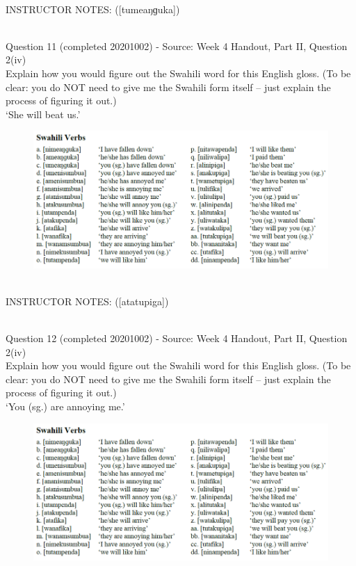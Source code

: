 \documentclass[12pt]{article}
\begin{document}
~\\
INSTRUCTOR NOTES: ([tumeaŋɡuka])


~\\

{\large Question 11} (completed 20201002) - Source: Week 4 Handout, Part II, Question 2(iv)\\

Explain how you would figure out the Swahili word for this English gloss. (To be clear: you do NOT need to give me the Swahili form itself -- just explain the process of figuring it out.)\\

‘She will beat us.’

\begin{figure}[H]
\includegraphics{../images/swahiliverbs.png}
\end{figure}

~\\
INSTRUCTOR NOTES: ([atatupiga])


~\\

{\large Question 12} (completed 20201002) - Source: Week 4 Handout, Part II, Question 2(iv)\\

Explain how you would figure out the Swahili word for this English gloss. (To be clear: you do NOT need to give me the Swahili form itself -- just explain the process of figuring it out.)\\

‘You (sg.) are annoying me.’

\begin{figure}[H]
\includegraphics{../images/swahiliverbs.png}
\end{figure}
\end{document}
